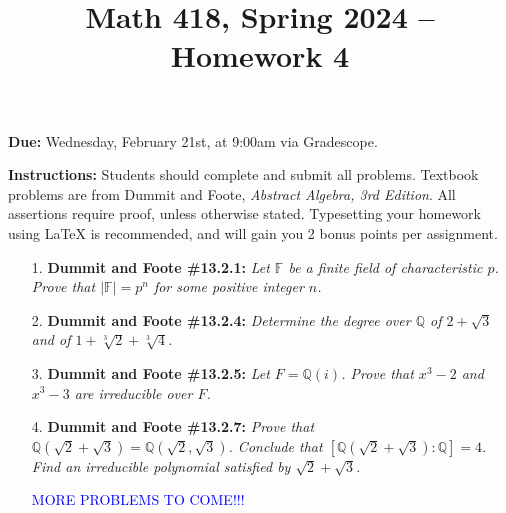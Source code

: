 \documentclass[12pt]{article}
\title{Math 418, Spring 2024 -- Homework 4}
\date{}
\newcommand{\Q}{\mathbb{Q}}
\newcommand{\F}{\mathbb{F}}
\begin{document}
 \maketitle
\vspace{-80pt}

\textbf{Due:} Wednesday, February 21st, at 9:00am via Gradescope.

\textbf{Instructions:} Students should complete and submit all problems. Textbook problems are from Dummit and Foote, \emph{Abstract Algebra, 3rd Edition}. All assertions require proof, unless otherwise stated. Typesetting your homework using LaTeX is recommended, and will gain you 2 bonus points per assignment.

\begin{enumerate}

\item[1.] \textbf{Dummit and Foote \#13.2.1:} \textit{Let $\F$ be a finite field of characteristic $p$. Prove that $|\F| = p^n$ for some positive integer $n$.}

\item[2.] \textbf{Dummit and Foote \#13.2.4:} \textit{Determine the degree over $\Q$ of $2 + \sqrt{3}$ and of $1 + \sqrt[3]{2} + \sqrt[3]{4}$.}

\item[3.] \textbf{Dummit and Foote \#13.2.5:} \textit{Let $F = \Q(i)$. Prove that $x^3 - 2$ and $x^3 - 3$ are irreducible over $F$.}

\item[4.] \textbf{Dummit and Foote \#13.2.7:} \textit{Prove that $\Q(\sqrt{2} + \sqrt{3}) = \Q(\sqrt{2}, \sqrt{3})$. Conclude that $[\Q(\sqrt{2} + \sqrt{3}) : \Q] = 4$. Find an irreducible polynomial satisfied by $\sqrt{2} + \sqrt{3}$.}

\vspace{10pt}
\centering \textcolor{blue}{MORE PROBLEMS TO COME!!!}

\end{enumerate}
\end{document}
